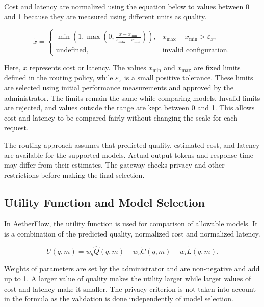 \documentclass{FastFyp}
\begin{document}
Cost and latency are normalized using the equation below to values between 0 and 1 because they are measured using different units as quality.

\begin{equation}
\tilde{x} =
\begin{cases}
\min\left(1,\max\left(0,
\frac{x-x_{\min}}{x_{\max}-x_{\min}}
\right)\right),
& x_{\max}-x_{\min}>\varepsilon_x,\\
\text{undefined}, & \text{invalid configuration}.
\end{cases}
\label{eq:normalization}
\end{equation}

Here, $x$ represents cost or latency. The values $x_{\min}$ and $x_{\max}$ are fixed limits defined in the routing policy, while $\varepsilon_x$ is a small positive tolerance. These limits are selected using initial performance measurements and approved by the administrator.
The limits remain the same while comparing models. Invalid limits are rejected, and values outside the range are kept between 0 and 1. This allows cost and latency to be compared fairly without changing the scale for each request.

The routing approach assumes that predicted quality, estimated cost, and latency are available for the supported models. Actual output tokens and response time may differ from their estimates. The gateway checks privacy and other restrictions before making the final selection.

\subsection{Utility Function and Model Selection}
\label{subsec:utility-func}

In AetherFlow, the utility function is used for comparison of allowable models. It is a combination of the predicted quality, normalized cost and normalized latency.

\begin{equation}
U(q,m) =
w_q\hat{Q}(q,m)
-
w_c\tilde{C}(q,m)
-
w_l\tilde{L}(q,m).
\label{eq:utility}
\end{equation}

Weights of parameters are set by the administrator and are non-negative and add up to 1. A larger value of quality makes the utility larger while larger values of cost and latency make it smaller. The privacy criterion is not taken into account in the formula as the validation is done independently of model selection.
\end{document}
